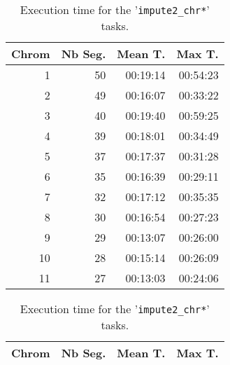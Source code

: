 \documentclass[10pt,twoside,english]{scrartcl}
\begin{document}
\begin{table}[H]
\protect\caption{Execution time for the '\texttt{impute2\_chr*}' tasks.\label{tab:impute2_exec_time}}

\centering

\begin{tabular}{rrrr}
\hline 
\multicolumn{1}{c}{\textbf{Chrom}}
 & \multicolumn{1}{c}{\textbf{Nb Seg.}}
 & \multicolumn{1}{c}{\textbf{Mean T.}}
 & \multicolumn{1}{c}{\textbf{Max T.}}
\\
\hline 

1 & 50 & {\color{light_gray}00:}19:14 & {\color{light_gray}00:}54:23\\
2 & 49 & {\color{light_gray}00:}16:07 & {\color{light_gray}00:}33:22\\
3 & 40 & {\color{light_gray}00:}19:40 & {\color{light_gray}00:}59:25\\
4 & 39 & {\color{light_gray}00:}18:01 & {\color{light_gray}00:}34:49\\
5 & 37 & {\color{light_gray}00:}17:37 & {\color{light_gray}00:}31:28\\
6 & 35 & {\color{light_gray}00:}16:39 & {\color{light_gray}00:}29:11\\
7 & 32 & {\color{light_gray}00:}17:12 & {\color{light_gray}00:}35:35\\
8 & 30 & {\color{light_gray}00:}16:54 & {\color{light_gray}00:}27:23\\
9 & 29 & {\color{light_gray}00:}13:07 & {\color{light_gray}00:}26:00\\
10 & 28 & {\color{light_gray}00:}15:14 & {\color{light_gray}00:}26:09\\
11 & 27 & {\color{light_gray}00:}13:03 & {\color{light_gray}00:}24:06\\
\hline 
\end{tabular}
\hspace{1cm}
\begin{tabular}{rrrr}
\hline 
\multicolumn{1}{c}{\textbf{Chrom}}
 & \multicolumn{1}{c}{\textbf{Nb Seg.}}
 & \multicolumn{1}{c}{\textbf{Mean T.}}
 & \multicolumn{1}{c}{\textbf{Max T.}}
\\
\hline 


\end{tabular}
\end{table}
\end{document}
